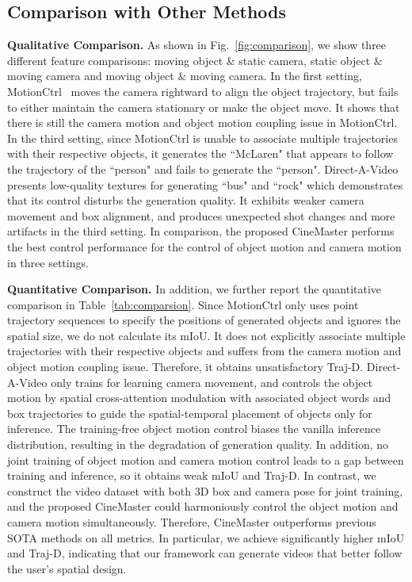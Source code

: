 \subsection{Comparison with Other Methods}
\noindent\textbf{Qualitative Comparison.} As shown in Fig.~\ref{fig:comparison}, we show three different feature comparisons: moving object $\&$ static camera, static object $\&$ moving camera and moving object $\&$ moving camera. In the first setting, MotionCtrl~\cite{MotionCtrl} moves the camera rightward to align the object trajectory, but fails to either maintain the camera stationary or make the object move. It shows that there is still the camera motion and object motion coupling issue in MotionCtrl. In the third setting, since MotionCtrl is unable to associate multiple trajectories with their respective objects, it generates the ``McLaren" that appears to follow the trajectory of the ``person" and fails to generate the ``person". Direct-A-Video~\cite{yang2024direct} presents low-quality textures for generating ``bus" and ``rock" which demonstrates that its control disturbs the generation quality. It exhibits weaker camera movement and box alignment, and produces unexpected shot changes and more artifacts in the third setting. In comparison, the proposed CineMaster performs the best control performance for the control of object motion and camera motion in three settings. 



\noindent\textbf{Quantitative Comparison.} In addition, we further report the quantitative comparison in Table~\ref{tab:comparsion}. Since MotionCtrl only uses point trajectory sequences to specify the positions of generated objects and ignores the spatial size, we do not calculate its mIoU. It does not explicitly associate multiple trajectories with their respective objects and suffers from the camera motion and object motion coupling issue. Therefore, it obtains unsatisfactory Traj-D. Direct-A-Video only trains for learning camera movement, and controls the object motion by spatial cross-attention modulation with associated object words and box trajectories to guide the spatial-temporal placement of objects only for inference. The training-free object motion control biases the vanilla inference distribution, resulting in the degradation of generation quality. In addition, no joint training of object motion and camera motion control leads to a gap between training and inference, so it obtains weak mIoU and Traj-D. In contrast, we construct the video dataset with both 3D box and camera pose for joint training, and the proposed CineMaster could harmoniously control the object motion and camera motion simultaneously. Therefore, CineMaster outperforms previous SOTA methods on all metrics. In particular, we achieve significantly higher mIoU and Traj-D, indicating that our framework can generate videos that better follow the user's spatial design.



